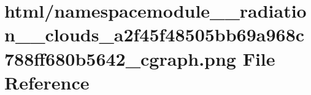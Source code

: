 \hypertarget{namespacemodule____radiation____clouds__a2f45f48505bb69a968c788ff680b5642__cgraph_8png}{}\section{html/namespacemodule\+\_\+\+\_\+radiation\+\_\+\+\_\+clouds\+\_\+a2f45f48505bb69a968c788ff680b5642\+\_\+cgraph.png File Reference}
\label{namespacemodule____radiation____clouds__a2f45f48505bb69a968c788ff680b5642__cgraph_8png}
